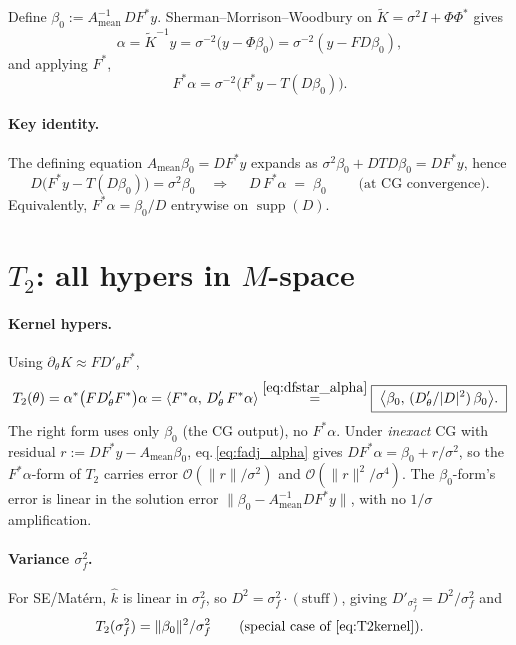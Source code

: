 \documentclass[11pt]{article}
\newcommand{\bigo}{\mathcal{O}}
\newcommand{\Ktil}{\widetilde K}
\newcommand{\Amean}{A_{\text{mean}}}
\begin{document}
Define $\beta_0 := \Amean^{-1}\,DF^*y$. Sherman--Morrison--Woodbury on $\Ktil = \sigma^2 I + \Phi\Phi^*$ gives
\begin{equation}
  \alpha = \Ktil^{-1}y = \sigma^{-2}\bigl(y - \Phi\beta_0\bigr) = \sigma^{-2}(y - FD\beta_0),
\end{equation}
and applying $F^*$,
\begin{equation}
  F^*\alpha = \sigma^{-2}\bigl(F^*y - T(D\beta_0)\bigr).\label{eq:fadj_alpha}
\end{equation}

\paragraph{Key identity.} The defining equation $\Amean\beta_0 = DF^*y$ expands as $\sigma^2\beta_0 + DTD\beta_0 = DF^*y$, hence
\begin{equation}
  D\bigl(F^*y - T(D\beta_0)\bigr) = \sigma^2\beta_0 \quad\Longrightarrow\quad
  \boxed{\; D\,F^*\alpha \;=\; \beta_0\;}\qquad\text{(at CG convergence)}.\label{eq:dfstar_alpha}
\end{equation}
Equivalently, $F^*\alpha = \beta_0/D$ entrywise on $\operatorname{supp}(D)$.

\section{$T_2$: all hypers in $M$-space}

\paragraph{Kernel hypers.} Using $\partial_\theta K\approx FD'_\theta F^*$,
\begin{equation}
  T_2(\theta)
  = \alpha^*\bigl(FD'_\theta F^*\bigr)\alpha
  = \langle F^*\alpha,\, D'_\theta\,F^*\alpha\rangle
  \overset{\eqref{eq:dfstar_alpha}}{=}
  \boxed{\;\bigl\langle \beta_0,\, (D'_\theta/|D|^2)\,\beta_0\bigr\rangle.\;}\label{eq:T2kernel}
\end{equation}
The right form uses only $\beta_0$ (the CG output), no $F^*\alpha$. Under \emph{inexact} CG with residual $r := DF^*y - \Amean\beta_0$, eq.\,\eqref{eq:fadj_alpha} gives $DF^*\alpha = \beta_0 + r/\sigma^2$, so the $F^*\alpha$-form of $T_2$ carries error $\bigo(\|r\|/\sigma^2)$ and $\bigo(\|r\|^2/\sigma^4)$. The $\beta_0$-form's error is linear in the solution error $\|\beta_0 - \Amean^{-1}DF^*y\|$, with no $1/\sigma$ amplification.

\paragraph{Variance $\sigma_f^2$.} For SE/Mat\'ern, $\hat k$ is linear in $\sigma_f^2$, so $D^2 = \sigma_f^2\cdot(\text{stuff})$, giving $D'_{\sigma_f^2} = D^2/\sigma_f^2$ and
\begin{equation}
  T_2(\sigma_f^2) = \|\beta_0\|^2/\sigma_f^2\qquad(\text{special case of \eqref{eq:T2kernel}}).
\end{equation}
\end{document}
